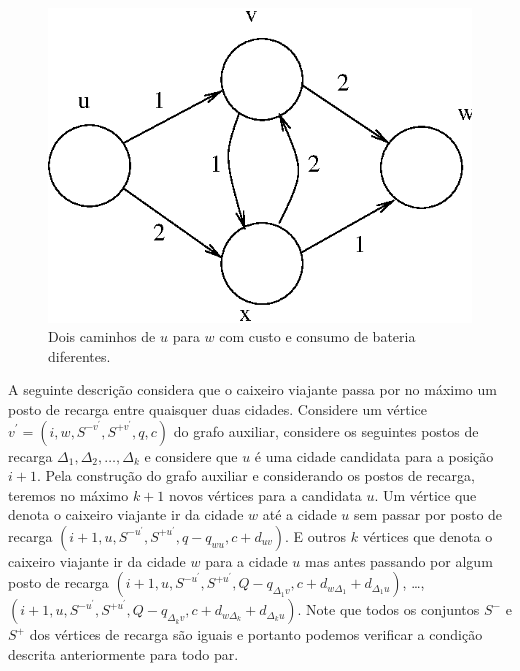 \documentclass{article}
\begin{document}
\begin{figure}[ht]
  \centering
  \includegraphics[scale=.7]{fig3.eps}
  \caption{Dois caminhos de $u$ para $w$ com custo e consumo de bateria diferentes.}
  \label{fig3}
\end{figure}


A seguinte descrição considera que o caixeiro viajante passa por no máximo um posto de recarga entre quaisquer duas cidades. Considere um vértice $v^\prime=(i, w, S^{-v^\prime}, S^{+v^\prime}, q, c)$ do grafo auxiliar, considere os seguintes postos de recarga $\Delta_1, \Delta_2, \dots, \Delta_k$ e considere que $u$ é uma cidade candidata para a posição $i+1$. Pela construção do grafo auxiliar e considerando os postos de recarga, teremos no máximo $k + 1$ novos vértices para a candidata $u$. Um vértice que denota o caixeiro viajante ir da cidade $w$ até a cidade $u$ sem passar por posto de recarga $(i+1, u, S^{-u^\prime}, S^{+u^\prime}, q-q_{wu}, c+d_{uv})$. E outros $k$ vértices que denota o caixeiro viajante ir da cidade $w$ para a cidade $u$ mas antes passando por algum posto de recarga $(i+1, u, S^{-u^\prime}, S^{+u^\prime}, Q-q_{\Delta_1v}, c+d_{w\Delta_1} + d_{\Delta_1u})$, \dots, $(i+1, u, S^{-u^\prime}, S^{+u^\prime}, Q-q_{\Delta_kv}, c+d_{w\Delta_k} + d_{\Delta_ku})$. Note que todos os conjuntos $S^-$ e $S^+$ dos vértices de recarga são iguais e portanto podemos verificar a condição descrita anteriormente para todo par.

\medskip
\printbibliography
\end{document}
